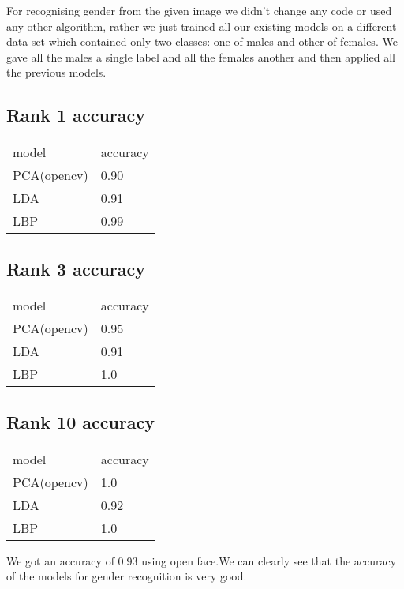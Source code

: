 For recognising gender from the given image we didn't change any code or used any other algorithm, rather we just trained all our existing models on a different data-set which contained only two classes: one of males and other of females. We gave all the males a single label and all the females another and then applied all the previous models.\\

\subsection{Rank 1 accuracy}

\begin{table}[!ht]
\begin{tabular}{ll}
model       & accuracy \\
PCA(opencv) & 0.90     \\
LDA         & 0.91     \\
LBP         & 0.99    
\end{tabular}
\end{table}

\newpage
\subsection{Rank 3 accuracy}

\begin{table}[!ht]
\begin{tabular}{ll}
model       & accuracy \\
PCA(opencv) & 0.95     \\
LDA         & 0.91     \\
LBP         & 1.0    
\end{tabular}
\end{table}

\subsection{Rank 10 accuracy}

\begin{table}[!ht]
\begin{tabular}{ll}
model       & accuracy \\
PCA(opencv) & 1.0     \\
LDA         & 0.92     \\
LBP         & 1.0    
\end{tabular}
\end{table}

 We got an accuracy of 0.93 using open face.We can clearly see that the accuracy of the models for gender recognition is very good.\\